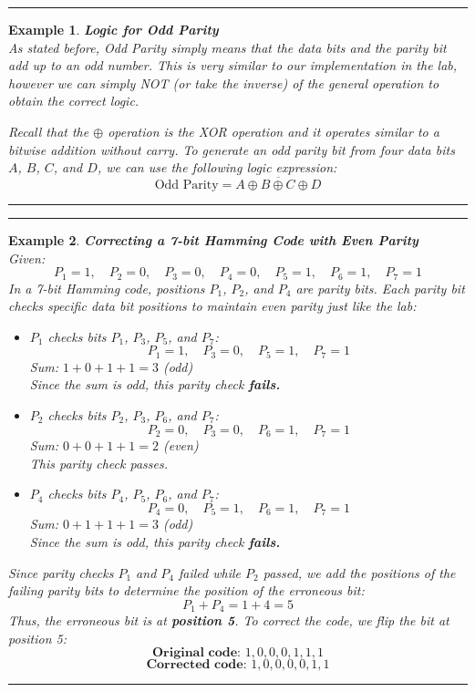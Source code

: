 \documentclass[12pt]{article}
\newtheorem{example}{Example}
\newenvironment{examp}
{\vspace{0.5cm}
 \hrule
\vspace{0.5cm}
\begin{example}}
{\hrule
\vspace{0.5cm}
\end{example}}
\begin{document}
\begin{examp}
	\textbf{Logic for Odd Parity}\\
	As stated before, Odd Parity simply means that the data bits and the parity bit add up to an odd number. This is very similar to our implementation in the lab, however we can simply NOT (or take the inverse) of the general operation to obtain the correct logic.

	Recall that the \(\oplus\) operation is the XOR operation and it operates similar to a bitwise addition without carry.
	To generate an odd parity bit from four data bits \( A \), \( B \), \( C \), and \( D \), we can use the following logic expression:
	\[			\text{Odd Parity} = \overline{A \oplus B \oplus C \oplus D}\]

\end{examp}
\begin{examp}
	\textbf{Correcting a 7-bit Hamming Code with Even Parity}\\
	Given:
	\[
		P_1 = 1, \quad P_2 = 0, \quad P_3 = 0, \quad P_4 = 0, \quad P_5 = 1, \quad P_6 = 1, \quad P_7 = 1
	\]
	In a 7-bit Hamming code, positions \( P_1 \), \( P_2 \), and \( P_4 \) are parity bits. Each parity bit checks specific data bit positions to maintain even parity just like the lab:
	\begin{itemize}
		\item \textbf{\( P_1 \)} checks bits \( P_1 \), \( P_3 \), \( P_5 \), and \( P_7 \):
		      \[
			      P_1 = 1, \quad P_3 = 0, \quad P_5 = 1, \quad P_7 = 1
		      \]
		      Sum: \( 1 + 0 + 1 + 1 = 3 \) (odd) \\
		      Since the sum is odd, this parity check \textbf{fails.}

		\item \textbf{\( P_2 \)} checks bits \( P_2 \), \( P_3 \), \( P_6 \), and \( P_7 \):
		      \[
			      P_2 = 0, \quad P_3 = 0, \quad P_6 = 1, \quad P_7 = 1
		      \]
		      Sum: \( 0 + 0 + 1 + 1 = 2 \) (even) \\
		      This parity check passes.

		\item \textbf{\( P_4 \)} checks bits \( P_4 \), \( P_5 \), \( P_6 \), and \( P_7 \):
		      \[
			      P_4 = 0, \quad P_5 = 1, \quad P_6 = 1, \quad P_7 = 1
		      \]
		      Sum: \( 0 + 1 + 1 + 1 = 3 \) (odd) \\
		      Since the sum is odd, this parity check \textbf{fails.}
	\end{itemize}
	Since parity checks \( P_1 \) and \( P_4 \) failed while \( P_2 \) passed, we add the positions of the failing parity bits to determine the position of the erroneous bit:
	\[
		P_1 + P_4 = 1 + 4 = 5
	\]
	Thus, the erroneous bit is at \textbf{position 5}.
	To correct the code, we flip the bit at position 5:
	\[
		\textbf{Original code: } 1, 0, 0, 0, 1, 1, 1
	\]
	\[
		\textbf{Corrected code: } 1, 0, 0, 0, 0, 1, 1
	\]
\end{examp}
\end{document}
